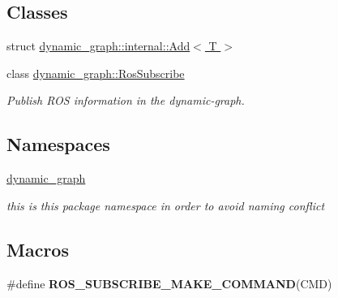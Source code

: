 \subsection*{Classes}
\begin{DoxyCompactItemize}
\item 
struct \hyperlink{structdynamic__graph_1_1internal_1_1Add}{dynamic\+\_\+graph\+::internal\+::\+Add$<$ T $>$}
\item 
class \hyperlink{classdynamic__graph_1_1RosSubscribe}{dynamic\+\_\+graph\+::\+Ros\+Subscribe}
\begin{DoxyCompactList}\small\item\em Publish R\+OS information in the dynamic-\/graph. \end{DoxyCompactList}\end{DoxyCompactItemize}
\subsection*{Namespaces}
\begin{DoxyCompactItemize}
\item 
 \hyperlink{namespacedynamic__graph}{dynamic\+\_\+graph}
\begin{DoxyCompactList}\small\item\em this is this package namespace in order to avoid naming conflict \end{DoxyCompactList}\end{DoxyCompactItemize}
\subsection*{Macros}
\begin{DoxyCompactItemize}
\item 
\#define {\bfseries R\+O\+S\+\_\+\+S\+U\+B\+S\+C\+R\+I\+B\+E\+\_\+\+M\+A\+K\+E\+\_\+\+C\+O\+M\+M\+A\+ND}(C\+MD)
\end{DoxyCompactItemize}
